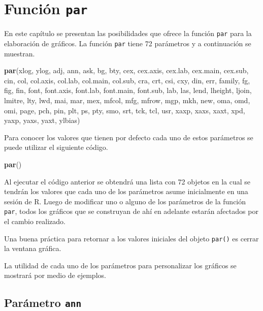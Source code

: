 \documentclass[10pt,]{krantz}
\makeatletter
\newenvironment{Shaded}{\begin{snugshade}}{\end{snugshade}}
\newcommand{\KeywordTok}[1]{\textcolor[rgb]{0.13,0.29,0.53}{\textbf{{#1}}}}
\newcommand{\NormalTok}[1]{{#1}}
\let\proglang=\textsf
\newenvironment{kframe}{%
\medskip{}
\setlength{\fboxsep}{.8em}
 \def\at@end@of@kframe{}%
 \ifinner\ifhmode%
  \def\at@end@of@kframe{\end{minipage}}%
  \begin{minipage}{\columnwidth}%
 \fi\fi%
 \def\FrameCommand##1{\hskip\@totalleftmargin \hskip-\fboxsep
 \colorbox{shadecolor}{##1}\hskip-\fboxsep
     \hskip-\linewidth \hskip-\@totalleftmargin \hskip\columnwidth}%
 \MakeFramed {\advance\hsize-\width
   \@totalleftmargin\z@ \linewidth\hsize
   \@setminipage}}%
 {\par\unskip\endMakeFramed%
 \at@end@of@kframe}
\renewenvironment{Shaded}{\begin{kframe}}{\end{kframe}}
\let\BeginKnitrBlock\begin \let\EndKnitrBlock\end
\makeatother
\begin{document}
\chapter{\texorpdfstring{Función
\texttt{par}}{Función par}}\label{funcion-par}

En este capítulo se presentan las posibilidades que ofrece la función
\texttt{par} para la elaboración de gráficos. La función \texttt{par}
tiene 72 parámetros y a continuación se muestran.

\begin{Shaded}
\begin{Highlighting}[]
\KeywordTok{par}\NormalTok{(xlog, ylog, adj, ann, ask, bg, bty, cex, cex.axis, cex.lab,}
    \NormalTok{cex.main, cex.sub, cin, col, col.axis, col.lab, col.main,}
    \NormalTok{col.sub, cra, crt, csi, cxy, din, err, family, fg, fig, fin,}
    \NormalTok{font, font.axis, font.lab, font.main, font.sub, lab, las, }
    \NormalTok{lend, lheight, ljoin, lmitre, lty, lwd, mai, mar, mex, mfcol,}
    \NormalTok{mfg, mfrow, mgp, mkh, new, oma, omd, omi, page, pch, pin, }
    \NormalTok{plt, ps, pty, smo, srt, tck, tcl, usr, xaxp, xaxs, xaxt, xpd, }
    \NormalTok{yaxp, yaxs, yaxt, ylbias)}
\end{Highlighting}
\end{Shaded}

Para conocer los valores que tienen por defecto cada uno de estos
parámetros se puede utilizar el siguiente código.

\begin{Shaded}
\begin{Highlighting}[]
\KeywordTok{par}\NormalTok{()}
\end{Highlighting}
\end{Shaded}

Al ejecutar el código anterior se obtendrá una lista con 72 objetos en
la cual se tendrán los valores que cada uno de los parámetros asume
inicialmente en una sesión de \proglang{R}. Luego de modificar uno o
alguno de los parámetros de la función \texttt{par}, todos los gráficos
que se construyan de ahí en adelante estarán afectados por el cambio
realizado.

\BeginKnitrBlock{rmdnote}
Una buena práctica para retornar a los valores iniciales del objeto
\texttt{par()} es cerrar la ventana gráfica.
\EndKnitrBlock{rmdnote}

La utilidad de cada uno de los parámetros para personalizar los gráficos
se mostrará por medio de ejemplos.

\section{\texorpdfstring{Parámetro \texttt{ann}
}{Parámetro ann  }}\label{parametro-ann}
\end{document}
